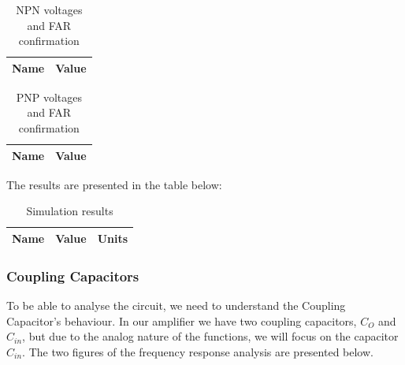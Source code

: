 \begin{table}[h]
    \centering
    \begin{tabular}{|c|c|}
    \hline
    {\bf Name} & {\bf Value} \\ \hline
    
    \end{tabular}
    \caption{NPN voltages and FAR confirmation}
    \label{tab:NPN}
\end{table}

\begin{table}[h]
    \centering
    \begin{tabular}{|c|c|}
    \hline
    {\bf Name} & {\bf Value} \\ \hline
    
    \end{tabular}
    \caption{PNP voltages and FAR confirmation}
    \label{tab:PNP}
\end{table}


The results are presented in the table below:

\begin{table}[h]
    \centering
    \begin{tabular}{|c|c|c|}
    \hline
    {\bf Name} & {\bf Value} & {\bf Units}\\ \hline
    
    \end{tabular}
    \caption{Simulation results}
    \label{tab:sim_results}
\end{table}


\subsubsection{Coupling Capacitors}

To be able to analyse the circuit, we need to understand the Coupling Capacitor's behaviour. In our amplifier we have two coupling capacitors, $C_O$ and $C_{in}$, but due to the analog nature of the functions, we will focus on the capacitor $C_{in}$.
The two figures of the frequency response analysis are presented below.

